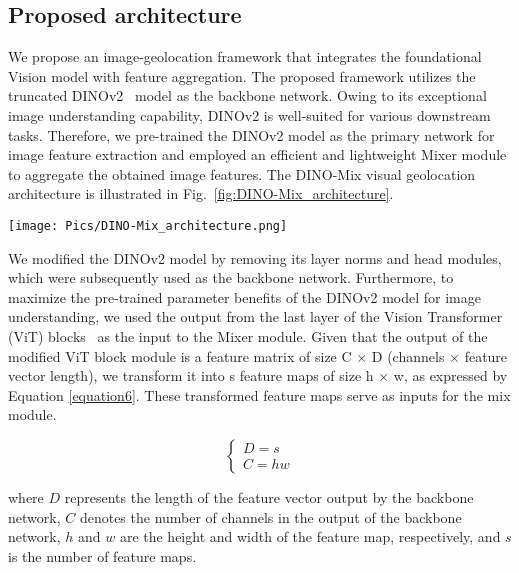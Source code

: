 
\subsection{Proposed architecture}
\label{proposed architecture}

We propose an image-geolocation framework that integrates the foundational Vision model with feature aggregation. The proposed framework utilizes the truncated DINOv2~\cite{oquab_dinov2_2023} model as the backbone network. Owing to its exceptional image understanding capability, DINOv2 is well-suited for various downstream tasks. Therefore, we pre-trained the DINOv2 model as the primary network for image feature extraction and employed an efficient and lightweight Mixer module to aggregate the obtained image features. The DINO-Mix visual geolocation architecture is illustrated in Fig.~\ref{fig:DINO-Mix_architecture}.



\begin{figure*}[!t]
\renewcommand{\thefigure}{2} 
    \centering
    \texttt{[image: Pics/DINO-Mix\_architecture.png]}
    \vspace{0em}
    \caption{\emph{\textbf{The visual place recognition structure of DINO-Mix.}}}
    \label{fig:DINO-Mix_architecture}
\end{figure*}

We modified the DINOv2 model by removing its layer norms and head modules, which were subsequently used as the backbone network. Furthermore, to maximize the pre-trained parameter benefits of the DINOv2 model for image understanding, we used the output from the last layer of the Vision Transformer (ViT) blocks~\cite{dosovitskiy_image_2021} as the input to the Mixer module. Given that the output of the modified ViT block module is a feature matrix of size C × D (channels × feature vector length), we transform it into s feature maps of size h × w, as expressed by Equation \ref{equation6}. These transformed feature maps serve as inputs for the mix module.

\begin{equation}
\label{equation6}
    \begin{cases}
        D = s \\
        C = hw
    \end{cases}
\end{equation}

where $D$ represents the length of the feature vector output by the backbone network, $C$ denotes the number of channels in the output of the backbone network, $h$ and $w$ are the height and width of the feature map, respectively, and $s$ is the number of feature maps.

